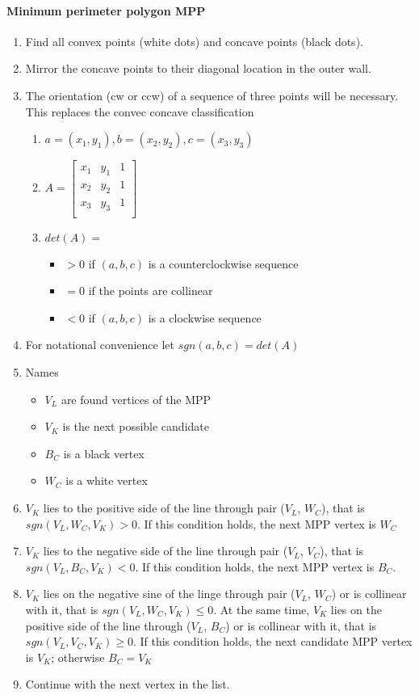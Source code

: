 \paragraph{Minimum perimeter polygon MPP}
\begin{enumerate}
\item Find all convex points (white dots) and concave points (black dots).
\item Mirror the concave points to their diagonal location in the outer wall.
\item The orientation (cw or ccw) of a sequence of three points will be necessary. This replaces the convec concave classification
\begin{enumerate}
\item $a=(x_1, y_1), b=(x_2, y_2), c=(x_3, y_3)$
\item $A=\begin{bmatrix}
	x_1 & y_1 & 1\\
  	x_2 & y_2 & 1\\
  	x_3 & y_3 & 1\\
\end{bmatrix}$
\item $det(A) =$ 
\begin{itemize}
\item $> 0$ if $(a, b, c)$ is a counterclockwise sequence
\item $= 0$ if the points are collinear
\item $< 0$ if $(a, b, c)$ is a clockwise sequence
\end{itemize}
\end{enumerate}
\item For notational convenience let $sgn(a,b,c) = det(A)$
\item Names
\begin{itemize}
\item $V_L$ are found vertices of the MPP
\item $V_K$ is the next possible candidate
\item $B_C$ is a black vertex
\item $W_C$ is a white vertex
\end{itemize} 
\item $V_K$ lies to the positive side of the line through pair ($V_L$, $W_C$), that is $sgn(V_L, W_C, V_K)>0$. If this condition holds, the next MPP vertex is $W_C$
\item $V_K$ lies to the negative side of the line through pair ($V_L$, $V_C$), that is $sgn(V_L, B_C, V_K)<0$. If this condition holds, the next MPP vertex is $B_C$.
\item $V_K$ lies on the negative sine of the linge through pair ($V_L$, $W_C$) or is collinear with it, that is $sgn(V_L, W_C, V_K) \le 0$. At the same time, $V_K$ lies on the positive side of the line through ($V_L$, $B_C$) or is collinear with it, that is $sgn(V_L, V_C, V_K) \ge 0$. If this condition holds, the next candidate MPP vertex is $V_K$; otherwise $B_C = V_K$
\item Continue with the next vertex in the list.
\end{enumerate}
